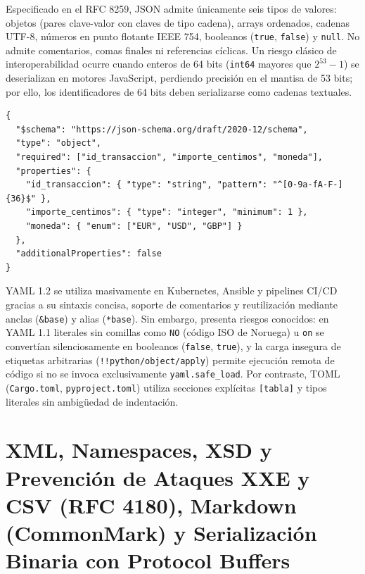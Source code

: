 \documentclass{book}
\begin{document}
Especificado en el RFC 8259, JSON admite únicamente seis tipos de valores: objetos (pares clave-valor con claves de tipo cadena), arrays ordenados, cadenas UTF-8, números en punto flotante IEEE 754, booleanos (\texttt{true}, \texttt{false}) y \texttt{null}. No admite comentarios, comas finales ni referencias cíclicas. Un riesgo clásico de interoperabilidad ocurre cuando enteros de 64 bits (\texttt{int64} mayores que \(2^{53} - 1\)) se deserializan en motores JavaScript, perdiendo precisión en el mantisa de 53 bits; por ello, los identificadores de 64 bits deben serializarse como cadenas textuales.
\begin{lstlisting}[style=studium]
{
  "$schema": "https://json-schema.org/draft/2020-12/schema",
  "type": "object",
  "required": ["id_transaccion", "importe_centimos", "moneda"],
  "properties": {
    "id_transaccion": { "type": "string", "pattern": "^[0-9a-fA-F-]{36}$" },
    "importe_centimos": { "type": "integer", "minimum": 1 },
    "moneda": { "enum": ["EUR", "USD", "GBP"] }
  },
  "additionalProperties": false
}
\end{lstlisting}
YAML 1.2 se utiliza masivamente en Kubernetes, Ansible y pipelines CI/CD gracias a su sintaxis concisa, soporte de comentarios y reutilización mediante anclas (\texttt{\&base}) y alias (\texttt{*base}). Sin embargo, presenta riesgos conocidos: en YAML 1.1 literales sin comillas como \texttt{NO} (código ISO de Noruega) u \texttt{on} se convertían silenciosamente en booleanos (\texttt{false}, \texttt{true}), y la carga insegura de etiquetas arbitrarias (\texttt{!!python/object/apply}) permite ejecución remota de código si no se invoca exclusivamente \texttt{yaml.safe\_load}. Por contraste, TOML (\texttt{Cargo.toml}, \texttt{pyproject.toml}) utiliza secciones explícitas \texttt{[tabla]} y tipos literales sin ambigüedad de indentación.

\section{XML, Namespaces, XSD y Prevención de Ataques XXE y CSV (RFC 4180), Markdown (CommonMark) y Serialización Binaria con Protocol Buffers}
\end{document}
